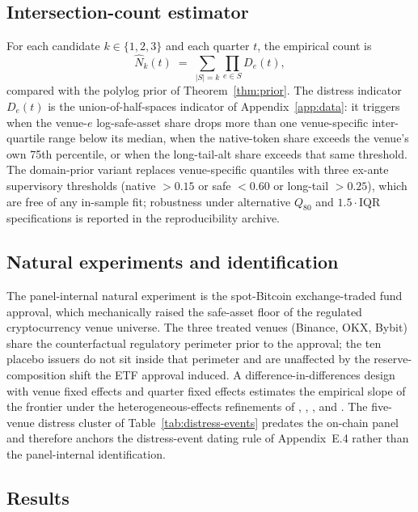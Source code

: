 \subsection{Intersection-count estimator}\label{sec:estimator}

For each candidate $k \in \{1,2,3\}$ and each quarter $t$, the
empirical count is
\[
\hat N_k(t) \;=\; \sum_{|S|=k} \prod_{e \in S} D_e(t),
\]
compared with the polylog prior of Theorem~\ref{thm:prior}. The
distress indicator $D_e(t)$ is the union-of-half-spaces indicator
of Appendix~\ref{app:data}: it triggers when the venue-$e$
log-safe-asset share drops more than one venue-specific
inter-quartile range below its median, when the native-token share
exceeds the venue's own 75th percentile, or when the long-tail-alt
share exceeds that same threshold. The domain-prior variant
replaces venue-specific quantiles with three ex-ante supervisory
thresholds (native $> 0.15$ or safe $< 0.60$ or long-tail $> 0.25$),
which are free of any in-sample fit; robustness under alternative
$Q_{80}$ and $1.5\cdot$IQR specifications is reported in the
reproducibility archive.

\subsection{Natural experiments and identification}\label{sec:identif}

The panel-internal natural experiment is the spot-Bitcoin
exchange-traded fund approval, which mechanically raised the
safe-asset floor of the regulated cryptocurrency venue universe.
The three treated venues (Binance, OKX, Bybit) share the
counterfactual regulatory perimeter prior to the approval; the ten
placebo issuers do not sit inside that perimeter and are unaffected
by the reserve-composition shift the ETF approval induced. A
difference-in-differences design with venue fixed effects and
quarter fixed effects estimates the empirical slope of the
frontier under the heterogeneous-effects refinements of
\citet{deChaisemartinDHaultfoeuille2020},
\citet{Callaway-SantAnna2021}, \citet{Sun-Abraham2021}, and
\citet{Borusyak2024}. The five-venue distress cluster of
Table~\ref{tab:distress-events} predates the on-chain panel and
therefore anchors the distress-event dating rule of
Appendix~E.4 rather than the panel-internal identification.

\subsection{Results}\label{sec:results}

